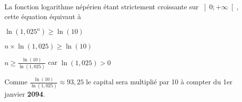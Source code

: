 \begin{corrige}
\begin{enumerate}
          \par
          La fonction logarithme népérien étant strictement croissante sur $\left]0;+\infty \right[$, cette équation équivaut à
          \par
          $\ln\left(1,025^{n}\right)\geqslant \ln\left(10\right)$
          \par
          $n\times \ln\left(1,025\right)\geqslant \ln\left(10\right)$
          \par
          $n\geqslant \frac{\ln\left(10\right)}{\ln\left(1,025\right)}$ car $\ln\left(1,025\right) > 0$
          \par
          Comme $\frac{\ln\left(10\right)}{\ln\left(1,025\right)}\approx 93,25$ le capital sera multiplié par 10 à compter du 1er janvier \textbf{2094}.
     \end{enumerate}
\end{corrige}
